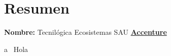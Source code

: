 \documentclass[a4paper, 12pt]{report} %
\begin{document}
	
        \tableofcontents
        \chapter{Resumen}
	\textbf{Nombre:} Tecnilógica Ecosistemas SAU \href{https://www.accenture.com/es-es/company-tecnilogica-accenture}{\textbf{\color{blue}Accenture}}
	\par a~\cite{buffett84} Hola ~\cite{watson53}
	\clearpage
	\printbibliography[heading=bibintoc]
\end{document}
